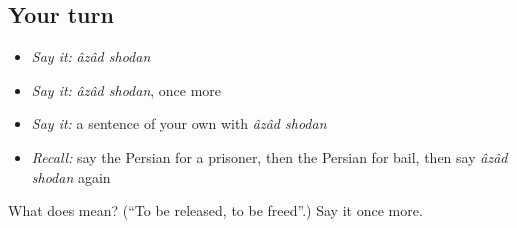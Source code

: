 \subsection*{Your turn}
\begin{itemize}
\raggedright
  \item \emph{Say it:} \emph{âzâd shodan}
  \item \emph{Say it:} \emph{âzâd shodan}, once more
  \item \emph{Say it:} a sentence of your own with \emph{âzâd shodan}
  \item \emph{Recall:} say the Persian for a prisoner, then the Persian for bail, then say \emph{âzâd shodan} again
\end{itemize}

\begin{tcolorbox}[breakable,colback=teal!4,colframe=teal!35!black,title={Before you move on}]
What does   mean? (\textquotedblleft{}To be released, to be freed\textquotedblright{}.) Say it once more.
\end{tcolorbox}
